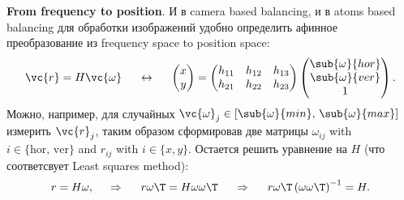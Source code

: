 
\textbf{From frequency to position}. И в camera based balancing, и в atoms based balancing для обработки изображений удобно определить афинное преобразование из frequency space to position space:
\begin{equation*}
	\vc{r} = H \vc{\omega}
	\hspace{5 mm} \leftrightarrow \hspace{5 mm} 
	\begin{pmatrix}
		x \\ y
	\end{pmatrix} = \begin{pmatrix}
		h_{11} & h_{12} & h_{13} \\
		h_{21} & h_{22} & h_{23} \\
	\end{pmatrix} 
	\begin{pmatrix}
		\sub{\omega}{hor} \\
		\sub{\omega}{ver} \\
		1
	\end{pmatrix}.
\end{equation*}
Можно, например, для случайных $\vc{\omega}_j \in [\sub{\omega}{min},\, \sub{\omega}{max}]$ измерить $\vc{r}_j$, таким образом сформировав две матрицы $\omega_{ij}$ with $i \in \{\mathrm{hor},\, \mathrm{ver}\}$ and $r_{ij}$ with $i \in \{x, y\}$. Остается решить уравнение на $H$ (что соответсвует Least squares method):
\begin{equation}
	r = H \omega,
	\hspace{0.5cm} \Rightarrow \hspace{0.5cm}
	r \omega\T = H \omega \omega\T
	\hspace{0.5cm} \Rightarrow \hspace{0.5cm}
	r \omega\T \left(\omega \omega\T\right)^{-1} = H.
	\label{LinReg:freq2pos}
\end{equation}